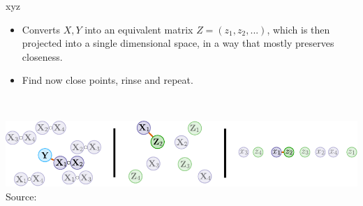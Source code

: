 \begin{frame}{xyz}
	\begin{itemize}
		\item Converts $X, Y$ into an equivalent matrix $Z = (z_1,z_2,...)$, which is then projected into a single dimensional space, in a way that mostly preserves closeness.
		\item Find now close points, rinse and repeat.
	\end{itemize}
	~\\
	\begin{minipage}{\linewidth}
		\centering
		\includegraphics[width=0.7\linewidth]{xyz_explanation}
		{Source: \cite{thanei2018xyz}}
	\end{minipage}
\end{frame}

